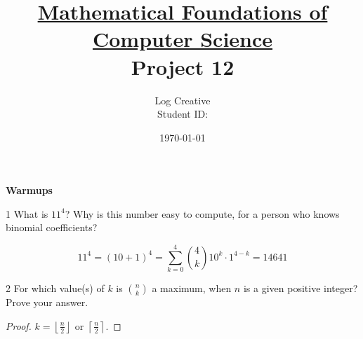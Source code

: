 \documentclass[a4paper,12pt]{article}
\title{\small \underline{Mathematical Foundations of Computer Science}\\\Large Project 12}
\author{Log Creative\\\small Student ID: }
\date{\today}
\makeatletter
\newtheorem*{solution}{Solution}
\theoremstyle{definition}
\renewenvironment{solution}[1][Solution] {\par\pushQED{\qed}\normalfont\topsep6\p@\@plus6\p@\relax\trivlist\item[\hskip\labelsep\bfseries#1\@addpunct{.}]\ignorespaces}{\popQED\endtrivlist\@endpefalse} \makeatother
\newenvironment{problems}{\begin{list}{}{\renewcommand{\makelabel}[1]{\textbf{##1}\hfil}}}{\end{list}}
\makeatother
\begin{document}
\maketitle

\noindent\textbf{Warmups}

\begin{problems}
    \item[1] What is $11^4$?  Why is this number easy to compute, for a person who knows binomial coefficients?
    \begin{solution}
        \begin{equation*}
            11^4 = (10+1)^4 = \sum_{k=0}^4 \binom{4}{k} 10^k\cdot 1^{4-k} = 14641
        \end{equation*}
    \end{solution} 
    \item[2]For which value(s) of $k$ is $\binom{n}{k}$ a maximum, when $n$ is a given positive integer?  Prove your answer.
    \begin{proof}
        $k=\left\lfloor \frac{n}{2}\right\rfloor$ or $\left\lceil \frac{n}{2}\right\rceil$.


\end{proof}
\end{problems}
\end{document}
